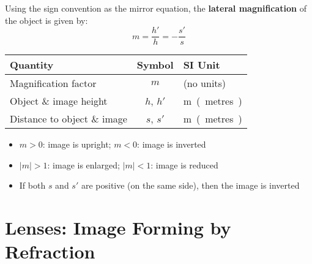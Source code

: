 %
%
%
Using the sign convention as the mirror equation, the
\textbf{lateral magnification} of the object is given by:
\begin{equation}
  \boxed{m=\frac{h'}h=-\frac{s'}s}
\end{equation}
\begin{center}
  \begin{tabular}{l|c|l}
    \rowcolor{pink}
    \textbf{Quantity} & \textbf{Symbol} & \textbf{SI Unit} \\ \hline
    Magnification factor & $m$ & (no units)\\
    Object \& image height & $h$, $h'$  & \si\metre (metres)\\
    Distance to object \& image & $s$, $s'$  & \si\metre (metres)
  \end{tabular}
\end{center}
\begin{itemize}
\item $m>0$: image is upright; $m<0$: image is inverted
\item $|m|>1$: image is enlarged; $|m|<1$: image is reduced
\item If both $s$ and $s'$ are positive (on the same side), then the image
  is inverted
\end{itemize}




\section{Lenses: Image Forming by Refraction}

